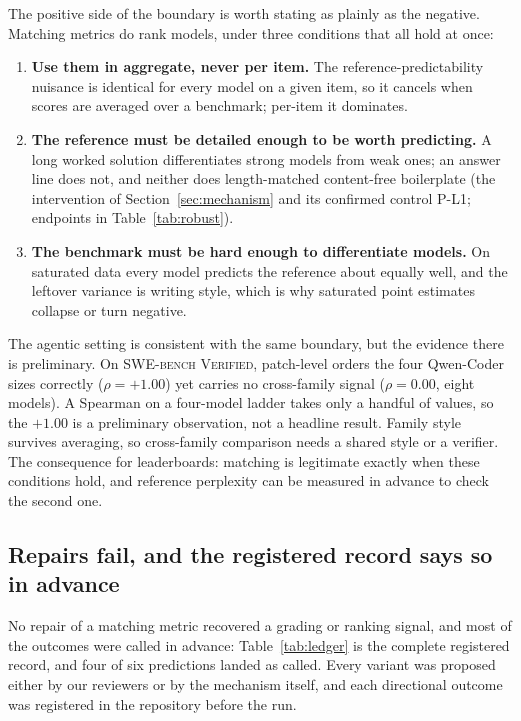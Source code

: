 The positive side of the boundary is worth stating as plainly as the negative.
Matching metrics do rank models, under three conditions that all hold at once:
\begin{enumerate}
\item \textbf{Use them in aggregate, never per item.}
The reference-predictability nuisance is identical for every model on a given item, so it cancels when scores are averaged over a benchmark; per-item it dominates.
\item \textbf{The reference must be detailed enough to be worth predicting.}
A long worked solution differentiates strong models from weak ones; an answer line does not, and neither does length-matched content-free boilerplate (the intervention of Section~\ref{sec:mechanism} and its confirmed control P-L1; endpoints in Table~\ref{tab:robust}).
\item \textbf{The benchmark must be hard enough to differentiate models.}
On saturated data every model predicts the reference about equally well, and the leftover variance is writing style, which is why saturated point estimates collapse or turn negative.
\end{enumerate}

The agentic setting is consistent with the same boundary, but the evidence there is preliminary.
On \textsc{SWE-bench Verified}, patch-level \tfa{} orders the four Qwen-Coder sizes correctly ($\rho = +1.00$) yet carries no cross-family signal ($\rho = 0.00$, eight models).
A Spearman on a four-model ladder takes only a handful of values, so the $+1.00$ is a preliminary observation, not a headline result.
Family style survives averaging, so cross-family comparison needs a shared style or a verifier.
The consequence for leaderboards: matching is legitimate exactly when these conditions hold, and reference perplexity can be measured in advance to check the second one.

\subsection{Repairs fail, and the registered record says so in advance}
\label{sec:slate}

No repair of a matching metric recovered a grading or ranking signal, and most of the outcomes were called in advance: Table~\ref{tab:ledger} is the complete registered record, and four of six predictions landed as called.
Every variant was proposed either by our reviewers or by the mechanism itself, and each directional outcome was registered in the repository before the run.

